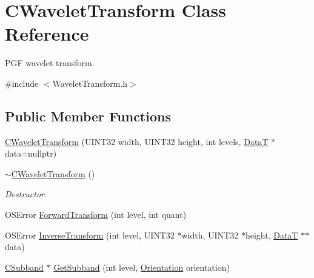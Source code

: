 \hypertarget{classCWaveletTransform}{}\section{C\+Wavelet\+Transform Class Reference}
\label{classCWaveletTransform}


P\+GF wavelet transform.  




{\ttfamily \#include $<$Wavelet\+Transform.\+h$>$}

\subsection*{Public Member Functions}
\begin{DoxyCompactItemize}
\item 
\mbox{\hyperlink{classCWaveletTransform_aaa781fda53530e8c4d4057335ef320cb}{C\+Wavelet\+Transform}} (U\+I\+N\+T32 width, U\+I\+N\+T32 height, int levels, \mbox{\hyperlink{PGFtypes_8h_acb1ee3f52ccfad782dcaa0abd79e5d05}{DataT}} $\ast$data=nullptr)
\item 
\mbox{\hyperlink{classCWaveletTransform_a222dd983545e969ed5faf32448020f1f}{$\sim$\+C\+Wavelet\+Transform}} ()
\begin{DoxyCompactList}\small\item\em Destructor. \end{DoxyCompactList}\item 
O\+S\+Error \mbox{\hyperlink{classCWaveletTransform_a7278418accd9329b9264ebe5f584001f}{Forward\+Transform}} (int level, int quant)
\item 
O\+S\+Error \mbox{\hyperlink{classCWaveletTransform_a26a70797c2a0db893876b75d131f420c}{Inverse\+Transform}} (int level, U\+I\+N\+T32 $\ast$width, U\+I\+N\+T32 $\ast$height, \mbox{\hyperlink{PGFtypes_8h_acb1ee3f52ccfad782dcaa0abd79e5d05}{DataT}} $\ast$$\ast$data)
\item 
\mbox{\hyperlink{classCSubband}{C\+Subband}} $\ast$ \mbox{\hyperlink{classCWaveletTransform_a347b59b1d7bc18de9294c714afac7ddf}{Get\+Subband}} (int level, \mbox{\hyperlink{PGFtypes_8h_a871118a09520247c78a71ecd7b0abd58}{Orientation}} orientation)
\end{DoxyCompactItemize}
